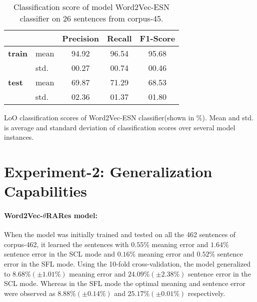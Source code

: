 \begin{table}[H]
\centering
\begin{threeparttable}
\caption[Generalization score with Word2Vec-ESN classifier on limited number of sentences.]{Classification score of model Word2Vec-ESN classifier on 26 sentences from corpus-45.}
\label{tab:corpus_45_scores}
\begin{tabular}{llccc}
\toprule
  	 			& 		 	&  Precision 		& Recall	& F1-Score\\
\midrule                
\textbf{train}	& mean 		& 94.92  			& 96.54 	& 95.68  \\
				& std. 		& 00.27 			& 00.74  	& 00.46  \\
\textbf{test}	& mean 		& 69.87  			& 71.29  	& 68.53 \\
				& std. 		& 02.36 			& 01.37 	& 01.80  \\
\bottomrule
\end{tabular}
\begin{tablenotes}
\small
\item 
LoO classification scores of Word2Vec-ESN classifier(shown in \%). Mean and std. is average and standard deviation of classification scores over several model instances.
\end{tablenotes}
\end{threeparttable}
\end{table}


\section{Experiment-2: Generalization Capabilities} \label{exp-2}

\paragraph{Word2Vec-$\theta$RARes model:} When the model was initially trained and tested on all the 462 sentences of corpus-462, it learned the sentences with $0.55\%$ meaning error and $1.64\%$ sentence error in the SCL mode and $0.16\%$ meaning error and $0.52\%$ sentence error in the SFL mode. Using the 10-fold cross-validation, the model generalized to $8.68\% (\pm 1.01\%) $ meaning error and $24.09\% (\pm 2.38\%)$ sentence error in the SCL mode. Whereas in the SFL mode the optimal meaning and sentence error were observed as $8.88\% (\pm 0.14\%)$ and $25.17\% (\pm 0.01\%)$ respectively.

